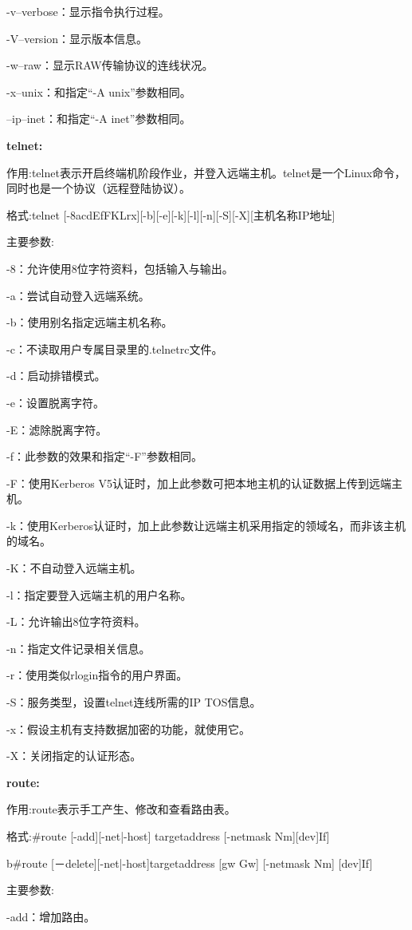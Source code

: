 -v--verbose：显示指令执行过程。

-V--version：显示版本信息。

-w--raw：显示RAW传输协议的连线状况。

-x--unix：和指定“-A unix”参数相同。

--ip--inet：和指定“-A inet”参数相同。

\textbf{telnet:}

作用:telnet表示开启终端机阶段作业，并登入远端主机。telnet是一个Linux命令，同时也是一个协议（远程登陆协议）。

格式:telnet [-8acdEfFKLrx][-b][-e][-k][-l][-n][-S][-X][主机名称IP地址]

主要参数:

-8：允许使用8位字符资料，包括输入与输出。

-a：尝试自动登入远端系统。

-b：使用别名指定远端主机名称。

-c：不读取用户专属目录里的.telnetrc文件。

-d：启动排错模式。

-e：设置脱离字符。

-E：滤除脱离字符。

-f：此参数的效果和指定“-F”参数相同。

-F：使用Kerberos V5认证时，加上此参数可把本地主机的认证数据上传到远端主机。

-k：使用Kerberos认证时，加上此参数让远端主机采用指定的领域名，而非该主机的域名。

-K：不自动登入远端主机。

-l：指定要登入远端主机的用户名称。

-L：允许输出8位字符资料。

-n：指定文件记录相关信息。

-r：使用类似rlogin指令的用户界面。

-S：服务类型，设置telnet连线所需的IP TOS信息。

-x：假设主机有支持数据加密的功能，就使用它。

-X：关闭指定的认证形态。

\textbf{route:}

作用:route表示手工产生、修改和查看路由表。

格式:\#route [-add][-net|-host] targetaddress [-netmask Nm][dev]If]

b\#route [－delete][-net|-host]targetaddress [gw Gw] [-netmask Nm] [dev]If]

主要参数:

-add：增加路由。

